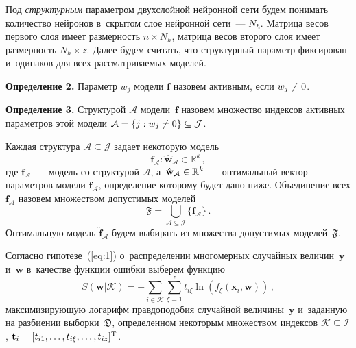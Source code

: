 \begin{multicols}{2}
 Под \textit{структурным} параметром двухслойной нейронной сети
будем понимать количество нейронов в~скрытом слое нейронной сети~--- $N_h$.
Матрица весов первого слоя имеет размерность $n \times N_h$, мат\-ри\-ца весов
второго слоя имеет размерность $N_h \times z$. Далее будем считать, что
структурный параметр фиксирован и~одинаков для всех рассматриваемых моделей.

\smallskip

\noindent
\textbf{Определение 2.}
Параметр $w_j$ модели $\mathbf{f}$ назовем активным, если $w_j \hm\neq 0$.


\smallskip

\noindent
\textbf{Определение 3.}
Структурой $\mathcal{A}$ модели~$\mathbf{f}$ назовем множество
индексов активных параметров этой модели $\mathcal{A} \hm= \{j: w_j \neq 0 \}
\subseteq \mathcal{J}$.


\smallskip

Каждая структура $\mathcal{A} \subseteq \mathcal{J}$ задает некоторую модель
\begin{equation*}
\mathbf{f}_{\mathcal{A}} : \mathbf{\hat{w}}_{\mathcal{A}} \in \mathbb{R}^k\,,
\end{equation*}
где $\mathbf{f}_{\mathcal{A}}$~--- модель со структурой $\mathcal{A}$,
а~$\mathbf{\hat{w}}_{\mathcal{A}}\hm \in \mathbb{R}^k$~--- оптимальный
вектор параметров модели $\mathbf{f}_{\mathcal{A}}$, определение которому
будет дано ниже. Объединение всех $\mathbf{f}_\mathcal{A}$ назовем множеством
допустимых моделей
\begin{equation}
\label{eq:2}
\mathfrak{F} = \bigcup\limits_{{\mathcal{A} \subseteq \mathcal{J}}}\{\mathbf{f}_\mathcal{A}\}\,.
\end{equation}
Оптимальную модель $\mathbf{\hat{f}}_{\mathcal{A}}$ будем выбирать из множества допустимых
моделей~$\mathfrak{F}$.

Согласно гипотезе~(\ref{eq:1}) о~распределении многомерных случайных
величин~$\mathbf{y}$ и~$\mathbf{w}$ в~качестве функции ошибки выберем функцию
\begin{equation*}
S(\mathbf{w}|\mathcal{K}) = - \sum\limits_{i \in \mathcal{K}}
\sum\limits_{\xi = 1}^{z} t_{i{\xi}}\ln
\left( f_{\xi}(\mathbf{x}_i, \mathbf{w}) \right)\,,
\end{equation*}
максимизирующую логарифм правдоподобия случайной
величины~$\mathbf{y}$ и~заданную на разбиении выборки~$\mathfrak{D}$,
определенном некоторым множеством индексов $\mathcal{K} \subseteq \mathcal{I}$,
$\mathbf{t}_i \hm= [t_{i1},\dots,t_{i\xi},\dots,t_{iz}]^{\mathrm{T}}$.



\end{multicols}
